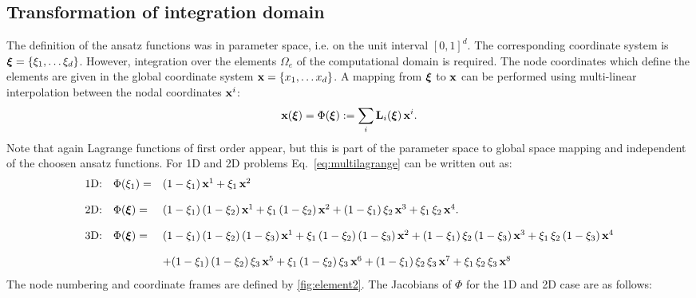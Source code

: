 \subsection{Transformation of integration domain}
The definition of the ansatz functions was in parameter space, i.e. on the unit interval $[0,1]^d$. The corresponding coordinate system is $\boldsymbol{\xi} = \{\xi_1, \dots \xi_d\}$. However, integration over the elements $\Omega_e$ of the computational domain is required. The node coordinates which define the elements are given in the global coordinate system $\textbf{x} = \{x_1, \dots x_d\}$. A mapping from $\boldsymbol{\xi}$ to $\textbf{x}$ can be performed using multi-linear interpolation between the nodal coordinates $\textbf{x}^i$:
\begin{equation}\label{eq:multilagrange}
  \begin{array}{ll}
    \textbf{x}(\boldsymbol{\xi}) = \Phi(\boldsymbol{\xi}) := \displaystyle\sum\limits_{i} \textbf{L}_i(\boldsymbol{\xi})\,\textbf{x}^i.
  \end{array}
\end{equation}
Note that again Lagrange functions of first order appear, but this is part of the parameter space to global space mapping and independent of the choosen ansatz functions. For 1D and 2D problems Eq.~\eqref{eq:multilagrange} can be written out as:
\begin{equation}\label{eq:fe_phi}
  \begin{array}{ll}
    \text{1D:}\quad
    \Phi(\xi_1) =& (1-\xi_1)\,\textbf{x}^1 + \xi_1\,\textbf{x}^2\\[4mm]
    \text{2D:}\quad
    \Phi(\boldsymbol{\xi}) =& (1-\xi_1)\,(1-\xi_2)\,\textbf{x}^1 + \xi_1\,(1-\xi_2)\,\textbf{x}^2 + (1-\xi_1)\,\xi_2\,\textbf{x}^3 + \xi_1\,\xi_2\,\textbf{x}^4.\\[4mm]
    \text{3D:}\quad
    \Phi(\boldsymbol{\xi}) =& 
      (1-\xi_1)\,(1-\xi_2)\,(1-\xi_3)\,\textbf{x}^1 + \xi_1\,(1-\xi_2)\,(1-\xi_3)\,\textbf{x}^2 + (1-\xi_1)\,\xi_2\,(1-\xi_3)\,\textbf{x}^3 + \xi_1\,\xi_2\,(1-\xi_3)\,\textbf{x}^4\\[4mm]
      &+ (1-\xi_1)\,(1-\xi_2)\,\xi_3\,\textbf{x}^5 + \xi_1\,(1-\xi_2)\,\xi_3\,\textbf{x}^6 + (1-\xi_1)\,\xi_2\,\xi_3\,\textbf{x}^7 + \xi_1\,\xi_2\,\xi_3\,\textbf{x}^8
    
  \end{array}
\end{equation}
The node numbering and coordinate frames are defined by \cref{fig:element2}.
The Jacobians of $\Phi$ for the 1D and 2D case are as follows:
